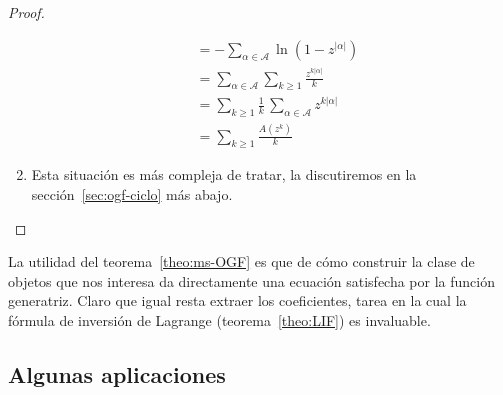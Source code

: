 \begin{proof}
\begin{enumerate}
\begin{align*}
	  &= - \sum_{\alpha \in \mathcal{A}}
		 \ln \left( 1 - z^{\lvert \alpha \rvert} \right) \\
	  &= \sum_{\alpha \in \mathcal{A}}
	       \sum_{k \ge 1}
		 \frac{z^{k \lvert \alpha \rvert}}{k} \\
	  &= \sum_{k \ge 1}
	       \frac{1}{k} \,
		 \sum_{\alpha \in \mathcal{A}}
		   z^{k \lvert \alpha \rvert} \\
	  &= \sum_{k \ge 1}
	       \frac{A(z^k)}{k}
      \end{align*}
    \item %
      Esta situación es más compleja de tratar,
      la discutiremos en la sección~\ref{sec:ogf-ciclo} más abajo.
      \qedhere
    \end{enumerate}
  \end{proof}
  La utilidad del teorema~\ref{theo:ms-OGF}
  es que de cómo construir
  la clase de objetos que nos interesa
  da directamente una ecuación satisfecha por la función generatriz.
  Claro que igual resta extraer los coeficientes,
  tarea en la cual la fórmula de inversión de Lagrange
  (teorema~\ref{theo:LIF})%
  es invaluable.

\subsection{Algunas aplicaciones}
\label{sec:ms-ogf-aplicaciones}

